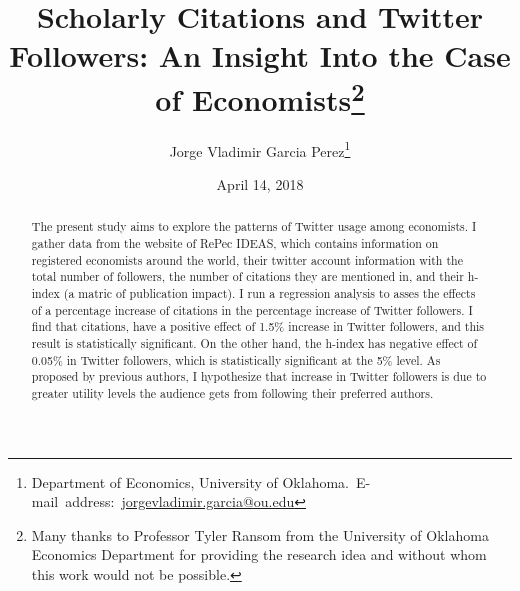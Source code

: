 \documentclass[12pt,english]{article}
\begin{document}
\begin{singlespace}
\title{Scholarly Citations and Twitter Followers: An Insight Into the Case of Economists\thanks{Many thanks to Professor Tyler Ransom from the University of Oklahoma Economics Department for providing the research idea and without whom this work would not be possible. }}
\end{singlespace}

\author{Jorge Vladimir Garcia Perez\thanks{Department of Economics, University of Oklahoma.\
E-mail~address:~\href{mailto:student.name@ou.edu}{jorgevladimir.garcia@ou.edu}}}

\date{April 14, 2018}

\maketitle

\begin{abstract}
\begin{singlespace}

The present study aims to explore the patterns of Twitter usage among economists. I gather data from the website of RePec IDEAS, which contains information on registered economists around the world, their twitter account information with the total number of followers, the number of citations they are mentioned in, and their h-index (a matric of publication impact). I run a regression analysis to asses the effects of a percentage increase of citations in the percentage increase of Twitter followers. I find that citations, have a positive effect of 1.5\% increase in Twitter followers, and this result is statistically significant. On the other hand, the h-index has negative effect of 0.05\% in Twitter followers, which is statistically significant at the 5\% level. As proposed by previous authors, I hypothesize that increase in Twitter followers is due to greater utility levels the audience gets from following their preferred authors. 

\end{singlespace}
\end{abstract}
\vfill{}
\pagebreak{}
\end{document}
